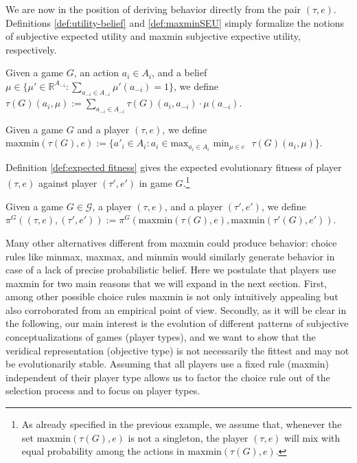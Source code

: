 \documentclass[fleqn,reqno,11pt]{article}
\begin{document}
We are now in the position of deriving behavior directly from the pair $(\tau, e)$. Definitions \ref{def:utility-belief} and \ref{def:maxminSEU} simply formalize the notions of subjective expected utility and maxmin subjective expective utility, respectively. 

\begin{definition} \label{def:utility-belief}

Given a game $G$, an action $a_i \in A_i$, and a belief $\mu \in \lbrace \mu' \in \mathbb{R}^{A_{-i}}: \sum_{a_{-i} \in A_{-i}} \mu'(a_{-i}) = 1 \rbrace$, we define $\tau(G)(a_i, \mu):= \sum_{a_{-i} \in A_{-i}} \tau(G)(a_i, a_{-i}) \cdot \mu(a_{-i})$. 

\end{definition}

\begin{definition} \label{def:maxminSEU}

Given a game $G$ and a player $(\tau, e)$, we define $\text{maxmin}(\tau(G), e):= \lbrace a'_i \in A_i : a_i \in \text{max}_{a_i \in A_i} \text{ min}_{\mu \in e} \text{ } \tau(G)(a_i, \mu) \rbrace$.

\end{definition}

\noindent Definition \ref{def:expected fitness} gives the expected evolutionary fitness of player $(\tau, e)$ against player $(\tau', e')$ in game $G$.\footnote{As already specified in the previous example, we assume that, whenever the set $\text{maxmin}(\tau(G), e)$ is not a singleton, the player $(\tau, e)$ will mix with equal probability among the actions in $\text{maxmin}(\tau(G), e)$.}

\begin{definition} \label{def:expected fitness}

Given a game $G \in \mathcal{G}$, a player $(\tau, e)$, and a player $(\tau', e')$, we define $\pi^G((\tau, e),(\tau', e')):= \pi^G(\text{maxmin}(\tau(G), e),\text{maxmin}(\tau'(G), e'))$. 

\end{definition}


Many other alternatives different from maxmin could produce behavior: choice rules like minmax, maxmax, and minmin would similarly generate behavior in case of a lack of precise probabilistic belief. Here we postulate that players use maxmin for two main reasons that we will expand in the next section. First, among other possible choice rules maxmin is not only intuitively appealing but also corroborated from an empirical point of view. Secondly, as it will be clear in the following, our main interest is the evolution of different patterns of subjective conceptualizations of games (player types), and we want to show that the veridical representation (objective type) is not necessarily the fittest and may not be evolutionarily stable. Assuming that all players use a fixed rule (maxmin) independent of their player type allows us to factor the choice rule out of the selection process and to focus on player types.
\end{document}
